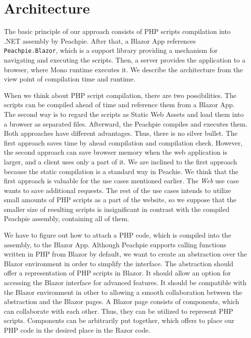 \section{Architecture}

The basic principle of our approach consists of PHP scripts compilation into .NET assembly by Peachpie.
After that, a Blazor App references \texttt{Peachpie.Blazor}, which is a support library providing a mechanism for navigating and executing the scripts.
Then, a server provides the application to a browser, where Mono runtime executes it.
We describe the architecture from the view point of compilation time and runtime.
\par
When we think about PHP script compilation, there are two possibilities.
The scripts can be compiled ahead of time and reference them from a Blazor App. 
The second way is to regard the scripts as Static Web Assets and load them into a browser as separated files.
Afterward, the Peachpie compiles and executes them.
Both approaches have different advantages. 
Thus, there is no silver bullet.
The first approach saves time by ahead compilation and compilation check.
However, the second approach can save browser memory when the web application is larger, and a client uses only a part of it.
We are inclined to the first approach because the static compilation is a standard way in Peachie.
We think that the first approach is valuable for the use cases mentioned earlier.
The \textit{Web} use case wants to save additional requests. 
The rest of the use cases intends to utilize small amounts of PHP scripts as a part of the website, so we suppose that the smaller size of resulting scripts is insignificant in contrast with the compiled Peachpie assembly, containing all of them. 
\par
We have to figure out how to attach a PHP code, which is compiled into the assembly, to the Blazor App.
Although Peachpie supports calling functions written in PHP from Blazor by default, we want to create an abstraction over the Blazor environment in order to simplify the interface.
The abstraction should offer a representation of PHP scripts in Blazor.
It should allow an option for accessing the Blazor interface for advanced features.
It should be compatible with the Blazor environment in other to allowing a smooth collaboration between the abstraction and the Blazor pages.
A Blazor page consists of components, which can collaborate with each other.
Thus, they can be utilized to represent PHP scripts.
Components can be arbitrarily put together, which offers to place our PHP code in the desired place in the Razor code.
